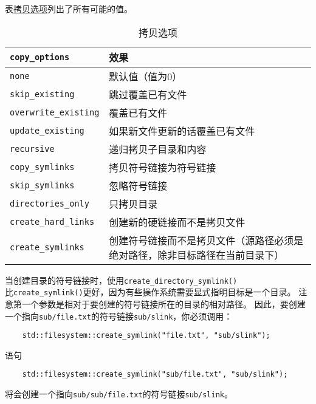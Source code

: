 表\hyperref[t20.16]{拷贝选项}列出了所有可能的值。
\begin{table}[ht]
    \centering
    \begin{tabular}{l|p{}}
        \hline
        \texttt{copy\_options}       & \textbf{效果}                            \\
        \hline
        \texttt{none}                & 默认值（值为0）                               \\
        \texttt{skip\_existing}      & 跳过覆盖已有文件                               \\
        \texttt{overwrite\_existing} & 覆盖已有文件                                 \\
        \texttt{update\_existing}    & 如果新文件更新的话覆盖已有文件                        \\
        \texttt{recursive}           & 递归拷贝子目录和内容                             \\
        \texttt{copy\_symlinks}      & 拷贝符号链接为符号链接                            \\
        \texttt{skip\_symlinks}      & 忽略符号链接                                 \\
        \texttt{directories\_only}   & 只拷贝目录                                  \\
        \texttt{create\_hard\_links} & 创建新的硬链接而不是拷贝文件                         \\
        \texttt{create\_symlinks}    & 创建符号链接而不是拷贝文件（源路径必须是绝对路径，除非目标路径在当前目录下） \\
        \hline
    \end{tabular}
    \caption{拷贝选项}
    \label{t20.16}
\end{table}
当创建目录的符号链接时，使用\texttt{create\_directory\_symlink()}\\
比\texttt{create\_symlink()}更好，因为有些操作系统需要显式指明目标是一个目录。
注意第一个参数是相对于要创建的符号链接所在的目录的相对路径。
因此，要创建一个指向\texttt{sub/file.txt}的符号链接\texttt{sub/slink}，你必须调用：
\begin{lstlisting}
    std::filesystem::create_symlink("file.txt", "sub/slink");
\end{lstlisting}
语句
\begin{lstlisting}
    std::filesystem::create_symlink("sub/file.txt", "sub/slink");
\end{lstlisting}
将会创建一个指向\texttt{sub/sub/file.txt}的符号链接\texttt{sub/slink}。

